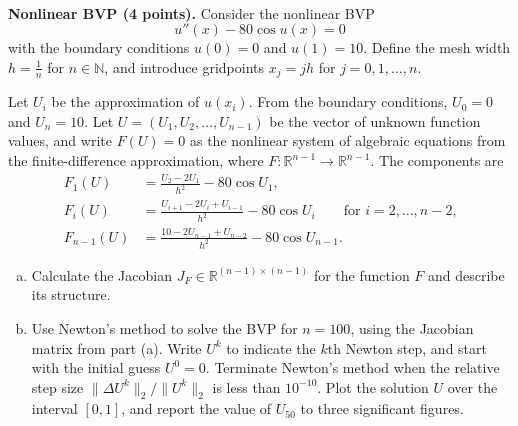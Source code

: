 \documentclass{article}
\def\R{{\mathbb R}}
\def\N{{\mathbb N}}
\begin{document}
\begin{problem} \\ 
  \textbf{Nonlinear BVP (4 points).}
        Consider the nonlinear BVP
        \begin{equation}
          u''(x) - 80\cos u(x) = 0
        \end{equation}
        with the boundary conditions $u(0)=0$ and $u(1)=10$. Define the mesh width
        $h=\tfrac1n$ for $n\in \N$, and introduce gridpoints $x_j=jh$ for
        $j=0,1,\ldots,n$.

        Let $U_i$ be the approximation of $u(x_i)$. From the boundary conditions,
        $U_0=0$ and $U_n=10$. Let $U=(U_1,U_2,\ldots,U_{n-1})$ be the vector of
        unknown function values, and write $F(U)=0$ as the nonlinear system
        of algebraic equations from the finite-difference approximation, where
        $F:\R^{n-1} \to \R^{n-1}$. The components are
        \begin{align}
          F_1(U)     & = \frac{U_2 - 2U_1}{h^2} - 80 \cos U_1,                                                 \\
          F_i(U)     & = \frac{U_{i+1} - 2U_i+ U_{i-1}}{h^2} - 80 \cos U_i \qquad \text{for $i=2,\ldots,n-2$,} \\
          F_{n-1}(U) & = \frac{10 - 2U_{n-1} + U_{n-2}}{h^2} - 80 \cos U_{n-1}.
        \end{align}
        \begin{enumerate}[a)]
          \item Calculate the Jacobian $J_F \in \R^{(n-1)\times(n-1)}$ for the function $F$ and
                describe its structure.
          \item Use Newton's method to solve the BVP for $n=100$, using the Jacobian matrix from part (a). Write $U^k$ to indicate the $k$th Newton step, and start with the initial guess $U^0=0$. Terminate Newton's method when the relative step size $\|\Delta U^k\|_2 / \|U^k\|_2$ is less than $10^{-10}$. Plot the solution $U$ over the interval $[0,1]$, and report the value of $U_{50}$ to three significant figures.
        \end{enumerate}
\end{problem}
\end{document}
